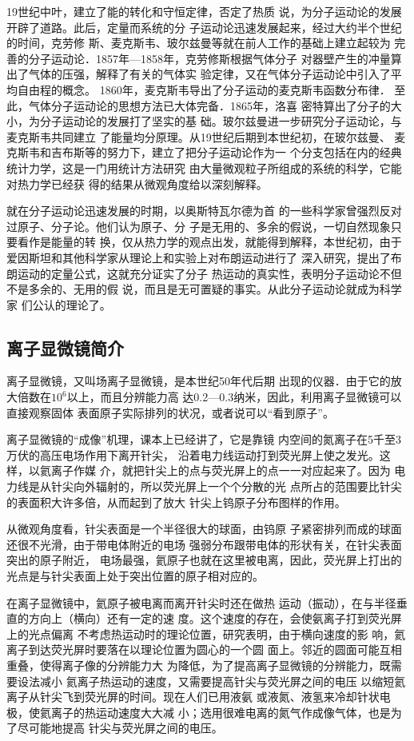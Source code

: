 19世纪中叶，建立了能的转化和守恒定律，否定了热质
说，为分子运动论的发展开辟了道路。此后，定量而系统的分
子运动论迅速发展起来，经过大约半个世纪的时间，克劳修
斯、麦克斯韦、玻尔兹曼等就在前人工作的基础上建立起较为
完善的分子运动论．1857年—1858年，克劳修斯根据气体分子
对器壁产生的冲量算出了气体的压强，解释了有关的气体实
验定律，又在气体分子运动论中引入了平均自由程的概念。
1860年，麦克斯韦导出了分子运动的麦克斯韦函数分布律．
至此，气体分子运动论的思想方法已大体完备．1865年，洛喜
密特算出了分子的大小，为分子运动论的发展打了坚实的基
础。玻尔兹曼进一步研究分子运动论，与麦克斯韦共同建立
了能量均分原理。从19世纪后期到本世纪初，在玻尔兹曼、
麦克斯韦和吉布斯等的努力下，建立了把分子运动论作为一
个分支包括在内的经典统计力学，这是一门用统计方法研究
由大量微观粒子所组成的系统的科学，它能对热力学已经获
得的结果从微观角度给以深刻解释。

就在分子运动论迅速发展的时期，以奥斯特瓦尔德为首
的一些科学家曾强烈反对过原子、分子论。他们认为原子、分
子是无用的、多余的假说，一切自然现象只要看作是能量的转
换，仅从热力学的观点出发，就能得到解释，本世纪初，由于
爱因斯坦和其他科学家从理论上和实验上对布朗运动进行了
深入研究，提出了布朗运动的定量公式，这就充分证实了分子
热运动的真实性，表明分子运动论不但不是多余的、无用的假
说，而且是无可置疑的事实。从此分子运动论就成为科学家
们公认的理论了。

\subsection{离子显微镜简介}

离子显微镜，又叫场离子显微镜，是本世纪50年代后期
出现的仪器．由于它的放大倍数在$10^6$以上，而且分辨能力高
达0.2—0.3纳米，因此，利用离子显微镜可以直接观察固体
表面原子实际排列的状况，或者说可以“看到原子”。

离子显微镜的“成像”机理，课本上已经讲了，它是靠镜
内空间的氮离子在5千至3万伏的高压电场作用下离开针尖，
沿着电力线运动打到荧光屏上使之发光。这样，以氦离子作媒
介，就把针尖上的点与荧光屏上的点一一对应起来了。因为
电力线是从针尖向外辐射的，所以荧光屏上一个个分散的光
点所占的范围要比针尖的表面积大许多倍，从而起到了放大
针尖上钨原子分布图样的作用。

从微观角度看，针尖表面是一个半径很大的球面，由钨原
子紧密排列而成的球面还很不光滑，由于带电体附近的电场
强弱分布跟带电体的形状有关，在针尖表面突出的原子附近，
电场最强，氦原子也就在这里被电离，因此，荧光屏上打出的
光点是与针尖表面上处于突出位置的原子相对应的。

在离子显微镜中，氦原子被电离而离开针尖时还在做热
运动（振动），在与半径垂直的方向上（横向）还有一定的速
度。这个速度的存在，会使氨离子打到荧光屏上的光点偏离
不考虑热运动时的理论位置，研究表明，由于横向速度的影
响，氦离子到达荧光屏时要落在以理论位置为圆心的一个圆
面上。邻近的圆面可能互相重叠，使得离子像的分辨能力大
为降低，为了提高离子显微镜的分辨能力，既需要设法减小
氦离子热运动的速度，又需要提高针尖与荧光屏之间的电压
以缩短氦离子从针尖飞到荧光屏的时间。现在人们已用液氨
或液氮、液氢来冷却针状电极，使氦离子的热运动速度大大减
小；选用很难电离的氮气作成像气体，也是为了尽可能地提高
针尖与荧光屏之间的电压。

